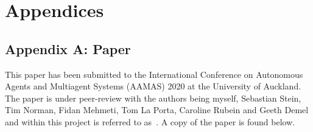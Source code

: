 \chapter*{Appendices}
\section*{Appendix A: Paper} \label{sec:aamas_paper} %
This paper has been submitted to the International Conference on Autonomous Agents and Multiagent Systems (AAMAS)
2020 at the University of Auckland. The paper is under peer-review with the authors being myself, Sebastian Stein,
Tim Norman, Fidan Mehmeti, Tom La Porta, Caroline Rubein and Geeth Demel and within this project is referred to
as~\cite{FlexibleResourceAllocation}. A copy of the paper is found below.








